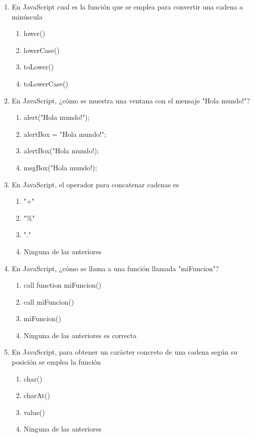 \documentclass[addpoints, 12]{exam}
\begin{document}
\begin{enumerate}
\item En JavaScript cual es la función que se emplea para convertir una cadena a minúscula 

\begin{enumerate}
\item lower()
\item lowerCase()
\item toLower()
\item toLowerCase()
\end{enumerate}

\item En JavaScript, ¿cómo se muestra una ventana con el mensaje "Hola mundo!"?

\begin{enumerate}
\item alert("Hola mundo!");
\item alertBox = "Hola mundo!";
\item alertBox("Hola mundo!);
\item msgBox("Hola mundo!);
\end{enumerate}

\item En JavaScript, el operador para concatenar cadenas es

\begin{enumerate}
\item "+"
\item "\%"
\item "."
\item Ninguna de las anteriores
\end{enumerate}

\item En JavaScript, ¿cómo se llama a una función llamada "miFuncion"?

\begin{enumerate}
\item call function miFuncion()
\item call miFuncion()
\item miFuncion()
\item Ninguna de las anteriores es correcta
\end{enumerate}

\item En JavaScript, para obtener un carácter concreto de una cadena según su posición se emplea la función

\begin{enumerate}
\item char()
\item charAt()
\item value()
\item Ninguna de las anteriores
\end{enumerate}


\end{enumerate}
\end{document}
